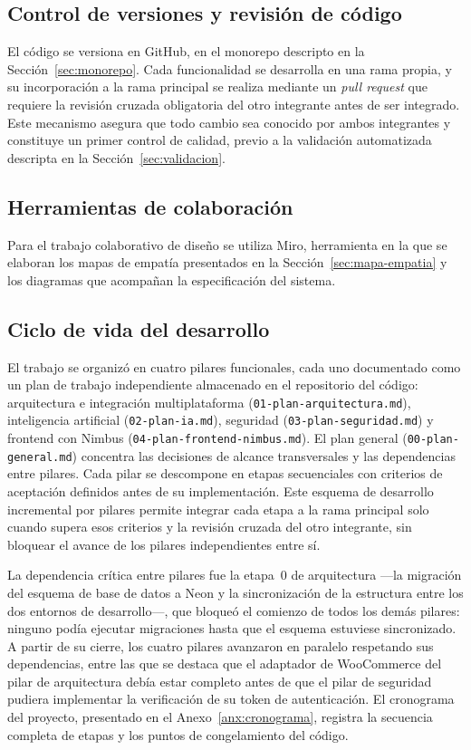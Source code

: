 \subsection{Control de versiones y revisión de código}
\label{sec:control-versiones}

El código se versiona en GitHub, en el monorepo descripto en la Sección~\ref{sec:monorepo}. Cada funcionalidad se desarrolla en una rama propia, y su incorporación a la rama principal se realiza mediante un \emph{pull request} que requiere la revisión cruzada obligatoria del otro integrante antes de ser integrado. Este mecanismo asegura que todo cambio sea conocido por ambos integrantes y constituye un primer control de calidad, previo a la validación automatizada descripta en la Sección~\ref{sec:validacion}.

\subsection{Herramientas de colaboración}
\label{sec:herramientas-colaboracion}

Para el trabajo colaborativo de diseño se utiliza Miro, herramienta en la que se elaboran los mapas de empatía presentados en la Sección~\ref{sec:mapa-empatia} y los diagramas que acompañan la especificación del sistema.

\subsection{Ciclo de vida del desarrollo}
\label{sec:ciclo-vida}

El trabajo se organizó en cuatro pilares funcionales, cada uno documentado como un plan de trabajo independiente almacenado en el repositorio del código: arquitectura e integración multiplataforma (\texttt{01-plan-arquitectura.md}), inteligencia artificial (\texttt{02-plan-ia.md}), seguridad (\texttt{03-plan-seguridad.md}) y frontend con Nimbus (\texttt{04-plan-frontend-nimbus.md}). El plan general (\texttt{00-plan-general.md}) concentra las decisiones de alcance transversales y las dependencias entre pilares. Cada pilar se descompone en etapas secuenciales con criterios de aceptación definidos antes de su implementación. Este esquema de desarrollo incremental por pilares permite integrar cada etapa a la rama principal solo cuando supera esos criterios y la revisión cruzada del otro integrante, sin bloquear el avance de los pilares independientes entre sí.

La dependencia crítica entre pilares fue la etapa~0 de arquitectura ---la migración del esquema de base de datos a Neon y la sincronización de la estructura entre los dos entornos de desarrollo---, que bloqueó el comienzo de todos los demás pilares: ninguno podía ejecutar migraciones hasta que el esquema estuviese sincronizado. A partir de su cierre, los cuatro pilares avanzaron en paralelo respetando sus dependencias, entre las que se destaca que el adaptador de WooCommerce del pilar de arquitectura debía estar completo antes de que el pilar de seguridad pudiera implementar la verificación de su token de autenticación. El cronograma del proyecto, presentado en el Anexo~\ref{anx:cronograma}, registra la secuencia completa de etapas y los puntos de congelamiento del código.

